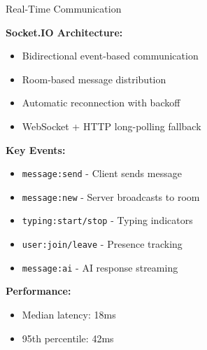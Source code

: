\documentclass{beamer}
\begin{document}
\begin{frame}{Real-Time Communication}

\textbf{Socket.IO Architecture:}

\begin{itemize}
    \item Bidirectional event-based communication
    \item Room-based message distribution
    \item Automatic reconnection with backoff
    \item WebSocket + HTTP long-polling fallback
\end{itemize}

\vspace{0.3cm}

\textbf{Key Events:}
\begin{itemize}
    \item \texttt{message:send} - Client sends message
    \item \texttt{message:new} - Server broadcasts to room
    \item \texttt{typing:start/stop} - Typing indicators
    \item \texttt{user:join/leave} - Presence tracking
    \item \texttt{message:ai} - AI response streaming
\end{itemize}

\vspace{0.3cm}

\textbf{Performance:}
\begin{itemize}
    \item Median latency: 18ms
    \item 95th percentile: 42ms
\end{itemize}

\end{frame}
\end{document}
